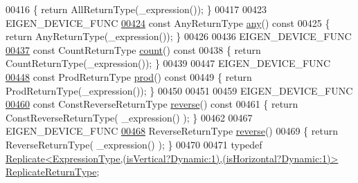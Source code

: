 \begin{DoxyCode}
00416 \textcolor{keyword}{    }\{ \textcolor{keywordflow}{return} AllReturnType(\_expression()); \}
00417 
00423     EIGEN\_DEVICE\_FUNC
\hyperlink{group___core___module_a7a513e04b7198f2fc565f636309337cc}{00424}     \textcolor{keyword}{const} AnyReturnType \hyperlink{group___core___module_a7a513e04b7198f2fc565f636309337cc}{any}()\textcolor{keyword}{ const}
00425 \textcolor{keyword}{    }\{ \textcolor{keywordflow}{return} AnyReturnType(\_expression()); \}
00426 
00436     EIGEN\_DEVICE\_FUNC
\hyperlink{group___core___module_abf7ae4a00d195d06d46ad6c269d8508f}{00437}     \textcolor{keyword}{const} CountReturnType \hyperlink{group___core___module_abf7ae4a00d195d06d46ad6c269d8508f}{count}()\textcolor{keyword}{ const}
00438 \textcolor{keyword}{    }\{ \textcolor{keywordflow}{return} CountReturnType(\_expression()); \}
00439 
00447     EIGEN\_DEVICE\_FUNC
\hyperlink{group___core___module_a6863499c3e7ea8635784376806abcf9f}{00448}     \textcolor{keyword}{const} ProdReturnType \hyperlink{group___core___module_a6863499c3e7ea8635784376806abcf9f}{prod}()\textcolor{keyword}{ const}
00449 \textcolor{keyword}{    }\{ \textcolor{keywordflow}{return} ProdReturnType(\_expression()); \}
00450 
00451 
00459     EIGEN\_DEVICE\_FUNC
\hyperlink{group___core___module_a058b821b65e2e27839853d9a25b0216c}{00460}     \textcolor{keyword}{const} ConstReverseReturnType \hyperlink{group___core___module_a058b821b65e2e27839853d9a25b0216c}{reverse}()\textcolor{keyword}{ const}
00461 \textcolor{keyword}{    }\{ \textcolor{keywordflow}{return} ConstReverseReturnType( \_expression() ); \}
00462 
00467     EIGEN\_DEVICE\_FUNC
\hyperlink{group___core___module_a094915725d604015221205e8c4ccb993}{00468}     ReverseReturnType \hyperlink{group___core___module_a094915725d604015221205e8c4ccb993}{reverse}()
00469     \{ \textcolor{keywordflow}{return} ReverseReturnType( \_expression() ); \}
00470 
00471     \textcolor{keyword}{typedef} 
      \hyperlink{group___core___module_class_eigen_1_1_replicate}{Replicate<ExpressionType,(isVertical?Dynamic:1),(isHorizontal?Dynamic:1)>}
       \hyperlink{group___core___module_class_eigen_1_1_replicate}{ReplicateReturnType};

\end{DoxyCode}
